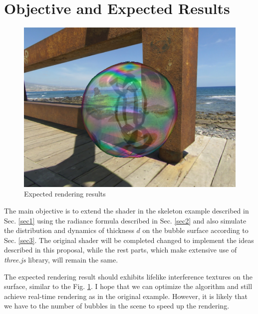 \documentclass[9pt, conference]{IEEEtran}
\begin{document}
\section{Objective and Expected Results}
\begin{figure}
	\vspace{-7pt}
	\centering
	\includegraphics[width=0.6\linewidth]{bubble_expected.png}
	\vspace{-10pt}
	\caption{\label{bubbleexpected}Expected rendering results \cite{bubblebase}}
	\vspace{-7pt}
\end{figure}

The main objective is to extend the shader in the skeleton example described in Sec. \ref{sec1} using the radiance formula described in Sec. \ref{sec2} and also simulate the distribution and dynamics of thickness $d$ on the bubble surface according to Sec. \ref{sec3}. The original shader will be completed changed to implement the ideas described in this proposal, while the rest parts, which make extensive use of \textit{three.js} library, will remain the same.

The expected rendering result should exhibits lifelike interference textures on the surface, similar to the Fig. \ref{bubbleexpected}. I hope that we can optimize the algorithm and still achieve real-time rendering as in the original example. However, it is likely that we have to the number of bubbles in the scene to speed up the rendering. 




\end{document}
